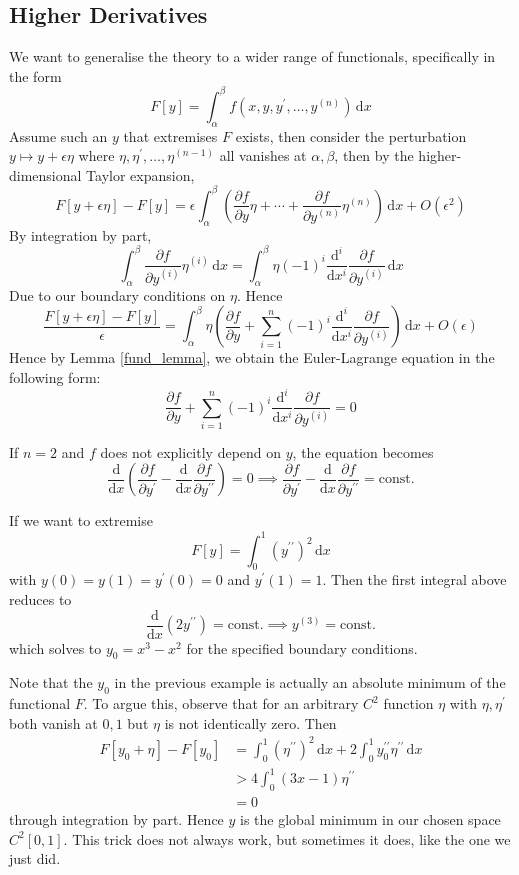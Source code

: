 \documentclass{article}
\begin{document}
\subsection{Higher Derivatives}
We want to generalise the theory to a wider range of functionals, specifically in the form
$$F[y]=\int_\alpha^\beta f(x,y,y^\prime,\ldots,y^{(n)})\,\mathrm dx$$
Assume such an $y$ that extremises $F$ exists, then consider the perturbation $y\mapsto y+\epsilon\eta$ where $\eta,\eta^\prime,\ldots,\eta^{(n-1)}$ all vanishes at $\alpha,\beta$, then by the higher-dimensional Taylor expansion,
$$F[y+\epsilon\eta]-F[y]=\epsilon\int_\alpha^\beta\left( \frac{\partial f}{\partial y}\eta+\cdots +\frac{\partial f}{\partial y^{(n)}}\eta^{(n)} \right)\,\mathrm dx+O(\epsilon^2)$$
By integration by part,
$$\int_\alpha^\beta\frac{\partial f}{\partial y^{(i)}}\eta^{(i)}\,\mathrm dx=\int_\alpha^\beta\eta(-1)^i\frac{\mathrm d^i}{\mathrm dx^i}\frac{\partial f}{\partial y^{(i)}}\,\mathrm dx$$
Due to our boundary conditions on $\eta$.
Hence
$$\frac{F[y+\epsilon\eta]-F[y]}{\epsilon}=\int_\alpha^\beta \eta\left(\frac{\partial f}{\partial y}+\sum_{i=1}^n(-1)^i\frac{\mathrm d^i}{\mathrm dx^i}\frac{\partial f}{\partial y^{(i)}}\right)\,\mathrm dx+O(\epsilon)$$
Hence by Lemma \ref{fund_lemma}, we obtain the Euler-Lagrange equation in the following form:
$$\boxed{\frac{\partial f}{\partial y}+\sum_{i=1}^n(-1)^i\frac{\mathrm d^i}{\mathrm dx^i}\frac{\partial f}{\partial y^{(i)}}=0}$$
\begin{example}
    If $n=2$ and $f$ does not explicitly depend on $y$, the equation becomes
    $$\frac{\mathrm d}{\mathrm dx}\left( \frac{\partial f}{\partial y^\prime}-\frac{\mathrm d}{\mathrm dx}\frac{\partial f}{\partial y^{\prime\prime}} \right)=0\implies \frac{\partial f}{\partial y^\prime}-\frac{\mathrm d}{\mathrm dx}\frac{\partial f}{\partial y^{\prime\prime}}=\text{const.}$$
\end{example}
\begin{example}
    If we want to extremise
    $$F[y]=\int_0^1(y^{\prime\prime})^2\,\mathrm dx$$
    with $y(0)=y(1)=y^\prime(0)=0$ and $y^\prime(1)=1$.
    Then the first integral above reduces to
    $$\frac{\mathrm d}{\mathrm dx}(2y^{\prime\prime})=\text{const.}\implies y^{(3)}=\text{const.}$$
    which solves to $y_0=x^3-x^2$ for the specified boundary conditions.
\end{example}
Note that the $y_0$ in the previous example is actually an absolute minimum of the functional $F$.
To argue this, observe that for an arbitrary $C^2$ function $\eta$ with $\eta,\eta^\prime$ both vanish at $0,1$ but $\eta$ is not identically zero.
Then
\begin{align*}
    F[y_0+\eta]-F[y_0]&=\int_0^1(\eta^{\prime\prime})^2\,\mathrm dx+2\int_0^1 y_0^{\prime\prime}\eta^{\prime\prime}\,\mathrm dx\\
    &>4\int_0^1(3x-1)\eta^{\prime\prime}\\
    &=0
\end{align*}
through integration by part.
Hence $y$ is the global minimum in our chosen space $C^2[0,1]$.
This trick does not always work, but sometimes it does, like the one we just did.
\end{document}
